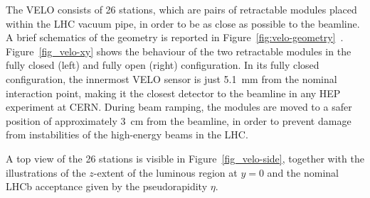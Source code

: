 The VELO consists of 26 stations, which are pairs of retractable modules placed within the LHC vacuum pipe, in order to be as close as possible to the beamline. 
A brief schematics of the geometry is reported in Figure~\ref{fig:velo-geometry}~\cite{LHCbVelo:2019flq}. Figure~\ref{fig_velo-xy} shows the behaviour of the two retractable modules in the fully closed (left) and fully open (right) configuration. In its fully closed configuration, the innermost VELO sensor is just \SI{5.1}{\milli\meter} from the nominal interaction point, making it the closest detector to the beamline in any HEP experiment at CERN. During beam ramping, the modules are moved to a safer position of approximately \SI{3}{\centi\meter} from the beamline, in order to prevent damage from instabilities of the high-energy beams in the LHC.

A top view of the 26 stations is visible in Figure~\ref{fig_velo-side}, together with the illustrations of the $z$-extent of the luminous region at $y=0$ and the nominal LHCb acceptance given by the pseudorapidity $\eta$. 

